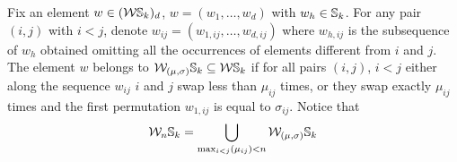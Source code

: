 \begin{definition}
	Fix an element $w\in (\mathcal{W}\mathbb{S}_k)_{d}$, $w=(w_{1},\dots , w_{d})$ with $w_{h}\in \mathbb{S}_k$.
	For any pair $(i,j)$ with $i< j$, denote $w_{ij}=(w_{1,ij},\dots , w_{d,ij})$ where $w_{h,ij}$ is the subsequence of $w_{h}$ obtained omitting all the occurrences of elements different from $i$ and $j$.
	The element $w$ belongs to $\mathcal{W}_{(\mu,\sigma)}\mathbb{S}_k\subseteq \mathcal{W}\mathbb{S}_k$ if for all pairs $(i,j)$, $i< j$ either along the sequence $w_{ij}$ $i$ and $j$ swap less than $\mu_{ij}$ times,
	or they swap exactly $\mu_{ij}$ times and the first permutation $w_{1,ij}$ is equal to $\sigma_{ij}$.
	Notice that
	\begin{equation*}
		\label{def}
		\mathcal{W}_{n}\mathbb{S}_k=\bigcup_{\max_{i<j} (\mu_{ij})< n} \mathcal{W}_{(\mu,\sigma)}\mathbb{S}_{k}
	\end{equation*}
	\\
	\\
\end{definition}
